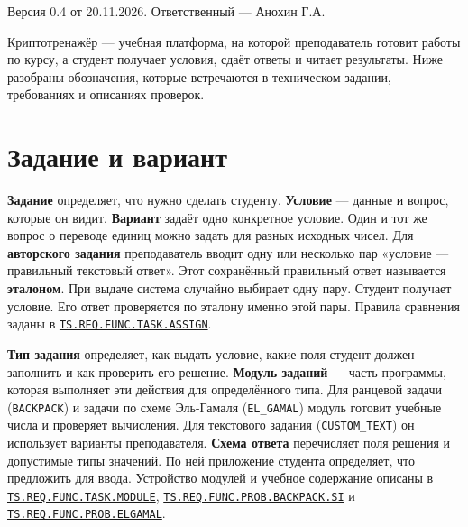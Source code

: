 \documentclass[12pt,a4paper]{article}
\begin{document}
Версия 0.4 от 20.11.2026. Ответственный --- Анохин Г.А.

Криптотренажёр --- учебная платформа, на которой преподаватель готовит работы по курсу, а студент получает условия, сдаёт ответы и читает результаты. Ниже разобраны обозначения, которые встречаются в техническом задании, требованиях и описаниях проверок.

\section{Задание и вариант}\label{ux437ux430ux434ux430ux43dux438ux435-ux438-ux432ux430ux440ux438ux430ux43dux442}

\hypertarget{задание-и-вариант}{}

\textbf{Задание} определяет, что нужно сделать студенту. \textbf{Условие} --- данные и вопрос, которые он видит. \textbf{Вариант} задаёт одно конкретное условие. Один и тот же вопрос о переводе единиц можно задать для разных исходных чисел. Для \textbf{авторского задания} преподаватель вводит одну или несколько пар «условие --- правильный текстовый ответ». Этот сохранённый правильный ответ называется \textbf{эталоном}. При выдаче система случайно выбирает одну пару. Студент получает условие. Его ответ проверяется по эталону именно этой пары. Правила сравнения заданы в {\href{../02\_Техническое\_задание/DOC-02\_Техническое\_задание.pdf\#ts-req-func-task-assign}{\texttt{TS.\allowbreak{}REQ.\allowbreak{}FUNC.\allowbreak{}TASK.\allowbreak{}ASSIGN}}}.

\textbf{Тип задания} определяет, как выдать условие, какие поля студент должен заполнить и как проверить его решение. \textbf{Модуль заданий} --- часть программы, которая выполняет эти действия для определённого типа. Для ранцевой задачи (\texttt{BACKPACK}) и задачи по схеме Эль-Гамаля (\texttt{EL\_GAMAL}) модуль готовит учебные числа и проверяет вычисления. Для текстового задания (\texttt{CUSTOM\_\allowbreak{}TEXT}) он использует варианты преподавателя. \textbf{Схема ответа} перечисляет поля решения и допустимые типы значений. По ней приложение студента определяет, что предложить для ввода. Устройство модулей и учебное содержание описаны в {\href{../02\_Техническое\_задание/DOC-02\_Техническое\_задание.pdf\#ts-req-func-task-module}{\texttt{TS.\allowbreak{}REQ.\allowbreak{}FUNC.\allowbreak{}TASK.\allowbreak{}MODULE}}}, {\href{../02\_Техническое\_задание/DOC-02\_Техническое\_задание.pdf\#ts-req-func-prob-backpack-si}{\texttt{TS.\allowbreak{}REQ.\allowbreak{}FUNC.\allowbreak{}PROB.\allowbreak{}BACKPACK.\allowbreak{}SI}}} и {\href{../02\_Техническое\_задание/DOC-02\_Техническое\_задание.pdf\#ts-req-func-prob-elgamal}{\texttt{TS.\allowbreak{}REQ.\allowbreak{}FUNC.\allowbreak{}PROB.\allowbreak{}ELGAMAL}}}.
\end{document}
